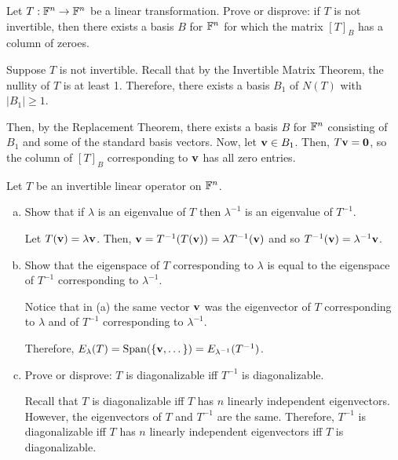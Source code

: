\documentclass{agony}
\begin{document}
\begin{prob}
  Let $T : \mathbb{F}^n \to \mathbb{F}^n$ be a linear transformation. Prove or disprove:
  if $T$ is not invertible, then there exists a basis $B$ for $\mathbb{F}^n$
  for which the matrix $[T]_B$ has a column of zeroes.
\end{prob}
\begin{prf}
  Suppose $T$ is not invertible.
  Recall that by the Invertible Matrix Theorem,
  the nullity of $T$ is at least 1.
  Therefore, there exists a basis $B_1$ of $N(T)$ with $|B_1| \geq 1$.

  Then, by the Replacement Theorem, there exists a basis $B$ for $\mathbb{F}^n$
  consisting of $B_1$ and some of the standard basis vectors.
  Now, let $\vb v \in B_1$.
  Then, $T\vb v = \vb 0$, so the column of $[T]_B$ corresponding to $\vb v$ has all zero entries.
\end{prf}

\begin{prob}
  Let $T$ be an invertible linear operator on $\mathbb{F}^n$.
\end{prob}
\begin{enumerate}[(a)]
  \item Show that if $\lambda$ is an eigenvalue of $T$
        then $\lambda^{-1}$ is an eigenvalue of $T^{-1}$.
        \begin{prf}
          Let $T(\vb v) = \lambda \vb v$.
          Then, $\vb v = T^{-1}(T(\vb v)) = \lambda T^{-1}(\vb v)$
          and so $T^{-1}(\vb v) = \lambda^{-1}\vb v$.
        \end{prf}
  \item Show that the eigenspace of $T$ corresponding to $\lambda$
        is equal to the eigenspace of $T^{-1}$ corresponding to $\lambda^{-1}$.
        \begin{prf}
          Notice that in (a) the same vector $\vb v$ was the eigenvector of
          $T$ corresponding to $\lambda$ and of $T^{-1}$ corresponding to $\lambda^{-1}$.

          Therefore, $E_{\lambda}(T) = \operatorname{Span}(\{\vb v,\dotsc\}) = E_{\lambda^{-1}}(T^{-1})$.
        \end{prf}
  \item Prove or disprove: $T$ is diagonalizable iff $T^{-1}$ is diagonalizable.
        \begin{prf}
          Recall that $T$ is diagonalizable iff $T$ has $n$ linearly independent eigenvectors.
          However, the eigenvectors of $T$ and $T^{-1}$ are the same.
          Therefore, $T^{-1}$ is diagonalizable iff $T$ has $n$ linearly independent eigenvectors
          iff $T$ is diagonalizable.
        \end{prf}
\end{enumerate}
\end{document}
